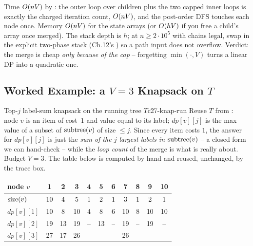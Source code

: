 \begin{complexitybox}
Time $O(nV)$ by : the outer loop over children plus
the two capped inner loops is exactly the charged iteration count, $O(nV)$,
and the post-order DFS touches each node once. Memory $O(nV)$ for the state
arrays (or $O(hV)$ if you free a child's array once merged). The stack
depth is $h$; at $n \ge 2\cdot10^{5}$ with chains legal, swap in the explicit
two-phase stack (Ch.12's ) so a path input does not overflow.
Verdict: the merge is cheap \emph{only because of the cap} -- forgetting
$\min(\cdot,V)$ turns a linear DP into a quadratic one.
\end{complexitybox}

\subsection{Worked Example: a $V=3$ Knapsack on $T$}

\begin{example}{Top-$j$ label-sum knapsack on the running tree $T$}{c27-knap-run}
Reuse $T$ from : node $v$ is an item of cost~$1$ and
value equal to its label; $\mathit{dp}[v][j]$ is the max value of a subset of
$\operatorname{subtree}(v)$ of size $\le j$. Since every item costs $1$, the answer for
$\mathit{dp}[v][j]$ is just the \emph{sum of the $j$ largest labels in
$\operatorname{subtree}(v)$} -- a closed form we can hand-check -- while the \emph{loop count}
of the merge is what  is really about. Budget $V=3$. The
table below is computed by hand and reused, unchanged, by the trace box.
\end{example}

\begin{center}
\small
\renewcommand{\arraystretch}{1.2}
\begin{tabular}{l|cccccccccc}
\toprule
node $v$ & 1 & 2 & 3 & 4 & 5 & 6 & 7 & 8 & 9 & 10 \\
\midrule
$\operatorname{size}(v)$ & 10 & 4 & 5 & 1 & 2 & 1 & 3 & 1 & 2 & 1 \\
$\mathit{dp}[v][1]$ & 10 & 8 & 10 & 4 & 8 & 6 & 10 & 8 & 10 & 10 \\
$\mathit{dp}[v][2]$ & 19 & 13 & 19 & -- & 13 & -- & 19 & -- & 19 & -- \\
$\mathit{dp}[v][3]$ & 27 & 17 & 26 & -- & -- & -- & 26 & -- & -- & -- \\
\bottomrule
\end{tabular}
\end{center}

